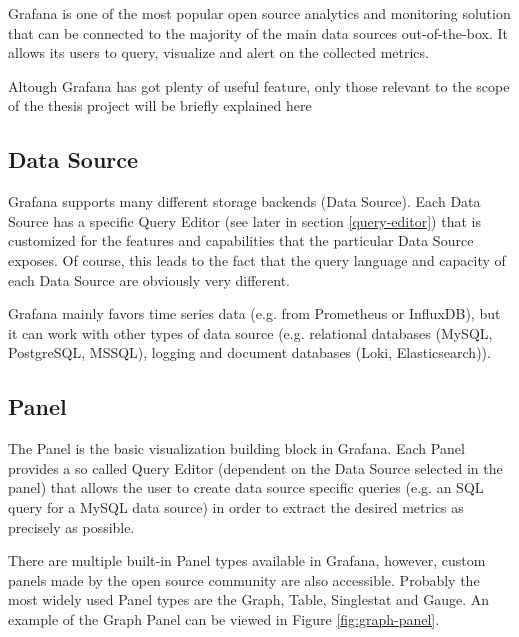 Grafana is one of the most popular open source analytics and monitoring solution that can be connected to the majority of the main data sources out-of-the-box. It allows its users to query, visualize and alert on the collected metrics. 

Altough Grafana has got plenty of useful feature, only those relevant to the scope of the thesis project will be briefly explained here


\subsection{Data Source}

Grafana supports many different storage backends (Data Source). Each Data Source has a specific Query Editor (see later in section \ref*{query-editor}) that is customized for the features and capabilities that the particular Data Source exposes. Of course, this leads to the fact that the query language and capacity of each Data Source are obviously very different. \cite{grafana-datasource}

Grafana mainly favors time series data (e.g. from Prometheus or InfluxDB), but it can work with other types of data source (e.g. relational databases (MySQL, PostgreSQL, MSSQL), logging and document databases (Loki, Elasticsearch)).

\subsection{Panel}

The Panel is the basic visualization building block in Grafana. Each Panel provides a so called Query Editor (dependent on the Data Source selected in the panel) that allows the user to create data source specific queries (e.g. an SQL query for a MySQL data source) in order to extract the desired metrics as precisely as possible. \cite{grafana-panel}

There are multiple built-in Panel types available in Grafana, however, custom panels made by the open source community are also accessible. Probably the most widely used Panel types are the Graph, Table, Singlestat and Gauge. An example of the Graph Panel can be viewed in Figure \ref{fig:graph-panel}.

